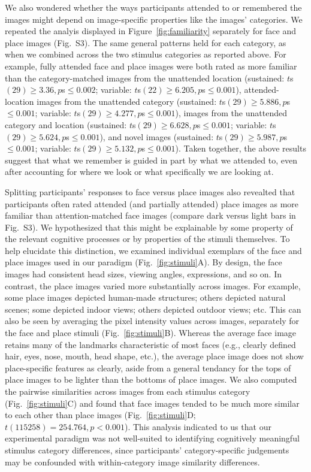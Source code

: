 \documentclass[english]{article}
\newcommand{\ratingsByCategory}{S3}
\begin{document}
We also wondered whether the ways participants attended to or remembered the
images might depend on image-specific properties like the images' categories.
We repeated the analyis displayed in Figure~\ref{fig:familiarity} separately
for face and place images (Fig.~\ratingsByCategory). The same general patterns
held for each category, as when we combined across the two stimulus categories
as reported above. For example, fully attended face and place images were both
rated as more familiar than the category-matched images from the unattended
location (sustained: $t$s$(29) \geq 3.36, p$s$ \leq 0.002$; variable: $t$s$(22)
\geq 6.205, p$s$ \leq 0.001$), attended-location images from the unattended
category (sustained: $t$s$(29) \geq 5.886, p$s$ \leq 0.001$; variable:
$t$s$(29) \geq 4.277, p$s$ \leq 0.001$), images from the unattended category
and location (sustained: $t$s$(29) \geq 6.628, p$s$ \leq 0.001$; variable:
$t$s$(29) \geq 5.624, p$s$ \leq 0.001$), and novel images (sustained: $t$s$(29)
\geq 5.987, p$s$ \leq 0.001$; variable: $t$s$(29) \geq 5.132, p$s$ \leq
0.001$). Taken together, the above results suggest that what we remember is
guided in part by what we attended to, even after accounting for where we look
or what specifically we are looking at.

Splitting participants' responses to face versus place images also revealted
that participants often rated attended (and partially attended) place images as
more familiar than attention-matched face images (compare dark versus light
bars in Fig.~\ratingsByCategory). We hypothesized that this might be
explainable by some property of the relevant cognitive processes or by
properties of the stimuli themselves. To help elucidate this distinction, we
examined individual exemplars of the face and place images used in our paradigm
(Fig.~\ref{fig:stimuli}A). By design, the face images had consistent head
sizes, viewing angles, expressions, and so on. In contrast, the place images
varied more substantially across images. For example, some place images
depicted human-made structures; others depicted natural scenes; some depicted
indoor views; others depicted outdoor views; etc. This can also be seen by
averaging the pixel intensity values across images, separately for the face and
place stimuli (Fig.~\ref{fig:stimuli}B). Whereas the average face image retains
many of the landmarks characteristic of most faces (e.g., clearly defined hair,
eyes, nose, mouth, head shape, etc.), the average place image does not show
place-specific features as clearly, aside from a general tendancy for the tops
of place images to be lighter than the bottoms of place images. We also
computed the pairwise similarities across images from each stimulus category
(Fig.~\ref{fig:stimuli}C) and found that face images tended to be much more
similar to each other than place images (Fig.~\ref{fig:stimuli}D; $t(115258) =
254.764, p < 0.001$). This analysis indicated to us that our experimental
paradigm was not well-suited to identifying cognitively meaningful stimulus
category differences, since participants' category-specific judgements may be
confounded with within-category image similarity differences.
\end{document}
